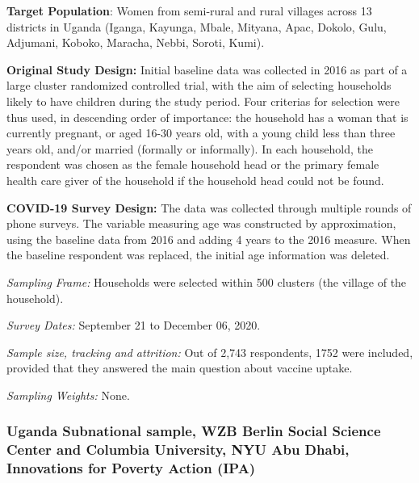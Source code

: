 \documentclass[
  12pt,
]{article}
\begin{document}
\textbf{Target Population}: Women from semi-rural and rural villages across 13 districts in Uganda (Iganga, Kayunga, Mbale, Mityana, Apac, Dokolo, Gulu, Adjumani, Koboko, Maracha, Nebbi, Soroti, Kumi).

\textbf{Original Study Design:} Initial baseline data was collected in 2016 as part of a large cluster randomized controlled trial, with the aim of selecting households likely to have children during the study period. Four criterias for selection were thus used, in descending order of importance: the household has a woman that is currently pregnant, or aged 16-30 years old, with a young child less than three years old, and/or married (formally or informally). In each household, the respondent was chosen as the female household head or the primary female health care giver of the household if the household head could not be found.

\textbf{COVID-19 Survey Design:} The data was collected through multiple rounds of phone surveys. The variable measuring age was constructed by approximation, using the baseline data from 2016 and adding 4 years to the 2016 measure. When the baseline respondent was replaced, the initial age information was deleted.

\emph{Sampling Frame:} Households were selected within 500 clusters (the village of the household).

\emph{Survey Dates:} September 21 to December 06, 2020.

\emph{Sample size, tracking and attrition:} Out of 2,743 respondents, 1752 were included, provided that they answered the main question about vaccine uptake.

\emph{Sampling Weights:} None.

\hypertarget{uganda-subnational-sample-wzb-berlin-social-science-center-and-columbia-university-nyu-abu-dhabi-innovations-for-poverty-action-ipa}{%
\subsubsection*{Uganda Subnational sample, WZB Berlin Social Science Center and Columbia University, NYU Abu Dhabi, Innovations for Poverty Action (IPA)}\label{uganda-subnational-sample-wzb-berlin-social-science-center-and-columbia-university-nyu-abu-dhabi-innovations-for-poverty-action-ipa}}
\end{document}
